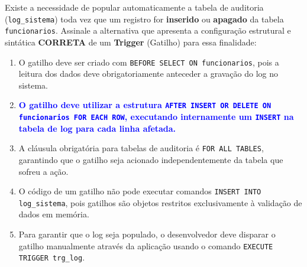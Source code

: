 \documentclass[12pt,a4paper]{article}
\begin{document}
\begin{enumerate}
\begin{center}
    \end{center}
    \vspace{0.3cm}

    Existe a necessidade de popular automaticamente a tabela de auditoria (\texttt{log\_sistema}) toda vez que um registro for \textbf{inserido} ou \textbf{apagado} da tabela \texttt{funcionarios}. Assinale a alternativa que apresenta a configuração estrutural e sintática \textbf{CORRETA} de um \textbf{Trigger} (Gatilho) para essa finalidade:
    
    \begin{enumerate}[label=\alph*)]
        \item O gatilho deve ser criado com \texttt{BEFORE SELECT ON funcionarios}, pois a leitura dos dados deve obrigatoriamente anteceder a gravação do log no sistema.
        \item[\textbf{\textcolor{blue}{b)}}] \textcolor{blue}{\textbf{O gatilho deve utilizar a estrutura \texttt{AFTER INSERT OR DELETE ON funcionarios FOR EACH ROW}, executando internamente um \texttt{INSERT} na tabela de log para cada linha afetada.}}
        \item A cláusula obrigatória para tabelas de auditoria é \texttt{FOR ALL TABLES}, garantindo que o gatilho seja acionado independentemente da tabela que sofreu a ação.
        \item O código de um gatilho não pode executar comandos \texttt{INSERT INTO log\_sistema}, pois gatilhos são objetos restritos exclusivamente à validação de dados em memória.
        \item Para garantir que o log seja populado, o desenvolvedor deve disparar o gatilho manualmente através da aplicação usando o comando \texttt{EXECUTE TRIGGER trg\_log}.
    \end{enumerate}


\end{enumerate}
\end{document}
